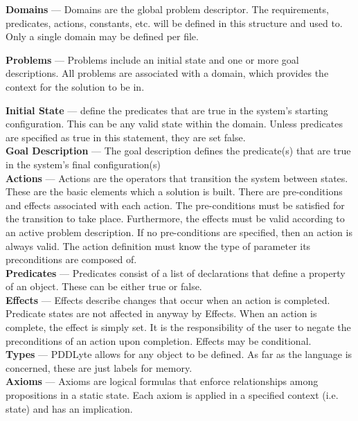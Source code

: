 \documentclass[
a4paper, %
11pt, %
onecolumn, %
openany, %
]{memoir}
\begin{document}
{\setlength{\parindent}{0cm}

\textbf{Domains} --- Domains are the global problem descriptor. The requirements, predicates, actions, constants, etc. will be defined in this structure and used to. Only a single domain may be defined per file.

\textbf{Problems} --- Problems include an initial state and one or more goal descriptions. All problems are associated with a domain, which provides the context for the solution to be in.

\textbf{Initial State} --- define the predicates that are true in the system's starting configuration. This can be any valid state within the domain. Unless predicates are specified as true in this statement, they are set false.\\

\textbf{Goal Description} --- The goal description defines the predicate(s) that are true in the system's final configuration(s)\\

\textbf{Actions} --- Actions are the operators that transition the system between states. These are the basic elements which a solution is built\cite{strips70}. There are pre-conditions and effects associated with each action. The pre-conditions must be satisfied for the transition to take place. Furthermore, the effects must be valid according to an active problem description. If no pre-conditions are specified, then an action is always valid. The action definition must know the type of parameter its preconditions are composed of. \\

\textbf{Predicates} --- Predicates consist of a list of declarations that define a property of an object. These can be either true or false. \\

\textbf{Effects} --- Effects describe changes that occur when an action is completed. Predicate states are not affected in anyway by Effects. When an action is complete, the effect is simply set. It is the responsibility of the user to negate the preconditions of an action upon completion. Effects may be conditional.\\

\textbf{Types} --- PDDLyte allows for any object to be defined. As far as the language is concerned, these are just labels for memory.\\

\textbf{Axioms} --- Axioms are logical formulas that enforce relationships among propositions in a static state. Each axiom is applied in a specified context (i.e. state) and has an implication.\\

}
\end{document}
